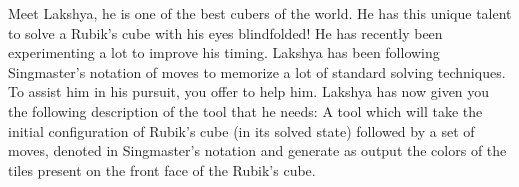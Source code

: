 {Meet Lakshya, he is one of the best cubers of the world. He has this unique talent to solve a Rubik's cube with his eyes blindfolded! He has recently been experimenting a lot to improve his timing. Lakshya has been following Singmaster's notation of moves to memorize a lot of standard solving techniques. To assist him in his pursuit, you offer to help him. Lakshya has now given you the following description of the tool that he needs: A tool which will take the initial configuration of Rubik's cube (in its solved state) followed by a set of moves, denoted in Singmaster's notation and generate as output the colors of the tiles present on the front face of the Rubik's cube.}
{}
{}
{}